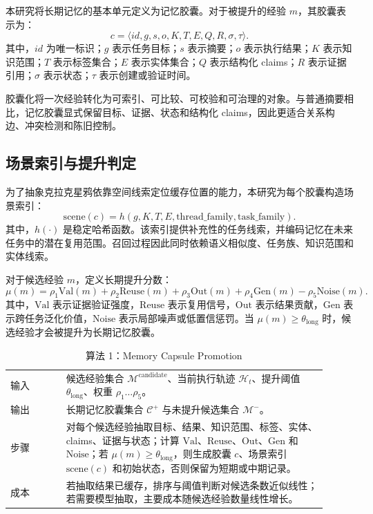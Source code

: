 \documentclass[a4paper,fleqn]{cas-sc}
\begin{document}
\begin{CJK*}{UTF8}{gbsn}
本研究将长期记忆的基本单元定义为记忆胶囊。对于被提升的经验 $m$，其胶囊表示为：
\begin{equation}
c = \langle id, g, s, o, K, T, E, Q, R, \sigma, \tau \rangle .
\end{equation}
其中，$id$ 为唯一标识；$g$ 表示任务目标；$s$ 表示摘要；$o$ 表示执行结果；$K$ 表示知识范围；$T$ 表示标签集合；$E$ 表示实体集合；$Q$ 表示结构化 claims；$R$ 表示证据引用；$\sigma$ 表示状态；$\tau$ 表示创建或验证时间。

胶囊化将一次经验转化为可索引、可比较、可校验和可治理的对象。与普通摘要相比，记忆胶囊显式保留目标、证据、状态和结构化 claims，因此更适合关系构边、冲突检测和陈旧控制。

\subsection{场景索引与提升判定}

为了抽象克拉克星鸦依靠空间线索定位缓存位置的能力，本研究为每个胶囊构造场景索引：
\begin{equation}
\mathrm{scene}(c)=h(g,K,T,E,\mathrm{thread\_family},\mathrm{task\_family}) .
\end{equation}
其中，$h(\cdot)$ 是稳定哈希函数。该索引提供补充性的任务线索，并编码记忆在未来任务中的潜在复用范围。召回过程因此同时依赖语义相似度、任务族、知识范围和实体线索。

对于候选经验 $m$，定义长期提升分数：
\begin{equation}
\mu(m)=
\rho_1\mathrm{Val}(m)
+\rho_2\mathrm{Reuse}(m)
+\rho_3\mathrm{Out}(m)
+\rho_4\mathrm{Gen}(m)
-\rho_5\mathrm{Noise}(m).
\end{equation}
其中，$\mathrm{Val}$ 表示证据验证强度，$\mathrm{Reuse}$ 表示复用信号，$\mathrm{Out}$ 表示结果贡献，$\mathrm{Gen}$ 表示跨任务泛化价值，$\mathrm{Noise}$ 表示局部噪声或低置信惩罚。当 $\mu(m)\geq\theta_{\text{long}}$ 时，候选经验才会被提升为长期记忆胶囊。

\begin{table}[t]
\centering
\scriptsize
\caption{算法 1：Memory Capsule Promotion}
\label{alg:capsule-promotion}
\setlength{\tabcolsep}{4pt}
\begin{tabular}{P{0.16\linewidth}P{0.75\linewidth}}
\toprule
输入 & 候选经验集合 $\mathcal{M}^{\text{candidate}}$、当前执行轨迹 $\mathcal{H}_t$、提升阈值 $\theta_{\text{long}}$、权重 $\rho_1\ldots\rho_5$。 \\
输出 & 长期记忆胶囊集合 $\mathcal{C}^{+}$ 与未提升候选集合 $\mathcal{M}^{-}$。 \\
步骤 & 对每个候选经验抽取目标、结果、知识范围、标签、实体、claims、证据与状态；计算 $\mathrm{Val}$、$\mathrm{Reuse}$、$\mathrm{Out}$、$\mathrm{Gen}$ 和 $\mathrm{Noise}$；若 $\mu(m)\geq\theta_{\text{long}}$，则生成胶囊 $c$、场景索引 $\mathrm{scene}(c)$ 和初始状态，否则保留为短期或中期记录。 \\
成本 & 若抽取结果已缓存，排序与阈值判断对候选条数近似线性；若需要模型抽取，主要成本随候选经验数量线性增长。 \\
\bottomrule
\end{tabular}
\end{table}


\end{CJK*}
\end{document}
